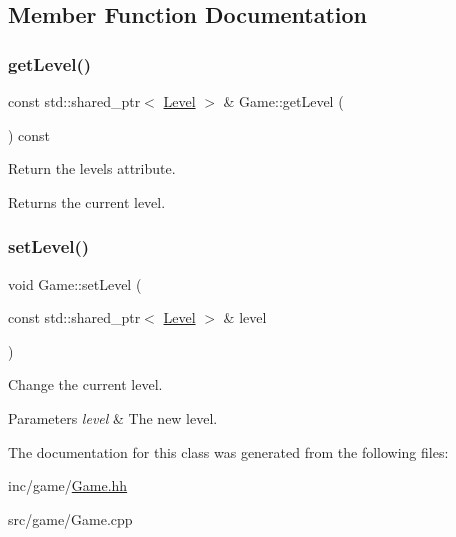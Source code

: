 \subsection{Member Function Documentation}
\mbox{\label{classGame_aad97bed9ceadea4fcf802feaebc66947}} 
\subsubsection{\texorpdfstring{get\+Level()}{getLevel()}}
{\footnotesize\ttfamily const std\+::shared\+\_\+ptr$<$ \hyperlink{classLevel}{Level} $>$ \& Game\+::get\+Level (\begin{DoxyParamCaption}{ }\end{DoxyParamCaption}) const}



Return the level\textquotesingle{}s attribute. 

\begin{DoxyReturn}{Returns}
the current level. 
\end{DoxyReturn}
\mbox{\label{classGame_a9b3ac5684d403e8b6ecdc83f268c420f}} 
\subsubsection{\texorpdfstring{set\+Level()}{setLevel()}}
{\footnotesize\ttfamily void Game\+::set\+Level (\begin{DoxyParamCaption}\item[{const std\+::shared\+\_\+ptr$<$ \hyperlink{classLevel}{Level} $>$ \&}]{level }\end{DoxyParamCaption})}



Change the current level. 


\begin{DoxyParams}{Parameters}
{\em level} & The new level. \\
\hline
\end{DoxyParams}


The documentation for this class was generated from the following files\+:\begin{DoxyCompactItemize}
\item 
inc/game/\hyperlink{Game_8hh}{Game.\+hh}\item 
src/game/Game.\+cpp\end{DoxyCompactItemize}
